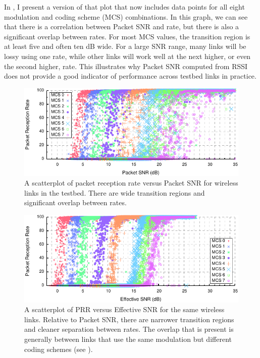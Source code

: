 In , I present a version of that plot that now includes data points for all eight modulation and coding scheme (MCS) combinations. In this graph, we can see that there is a correlation between Packet SNR and rate, but there is also a significant overlap between rates. For most MCS values, the transition region is at least five and often ten dB wide. For a large SNR range, many links will be lossy using one rate, while other links will work well at the next higher, or even the second higher, rate. This illustrates why Packet SNR computed from RSSI does not provide a good indicator of performance across testbed links in practice.

\begin{figure}[t!]
	\centering
	\includegraphics[width=\textwidth]{figures/delivery_figures/snr_prr_scatter_siso.pdf}
	\caption[PRR vs SNR for all SISO modulations]{\label{fig:snr_prr_siso} A scatterplot of packet reception rate versus Packet SNR for wireless links in the testbed. There are wide transition regions and significant overlap between rates.}
\end{figure}
\begin{figure}[t!]
	\centering
	\includegraphics[width=\textwidth]{figures/delivery_figures/esnr_prr_scatter_siso.pdf}
	\caption[PRR vs Effective SNR for all SISO modulations]{\label{fig:esnr_prr_siso}A scatterplot of PRR versus Effective SNR for the same wireless links. Relative to Packet SNR, there are narrower transition regions and cleaner separation between rates. The overlap that is present is generally between links that use the same modulation but different coding schemes (see ).}
\end{figure}

